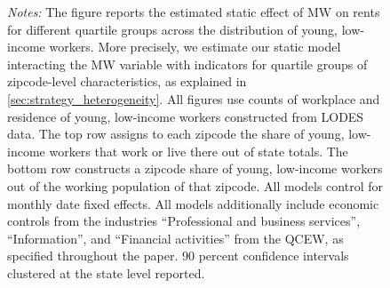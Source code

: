 \begin{figure}[htb!]
\begin{minipage}{\textwidth}
		\vspace{3mm}	
		\textit{Notes:} The figure reports the estimated static effect of MW on rents for different 
		quartile groups across the distribution of young, low-income workers. More precisely, we estimate
		our static model interacting the MW variable with indicators for quartile groups of zipcode-level 
		characteristics, as explained in \autoref{sec:strategy_heterogeneity}. All figures use counts of 
		workplace and residence of young, low-income workers constructed from LODES data. The top 
		row assigns to each zipcode the share of young, low-income workers that work or live there out 
		of state totals. The bottom row constructs a zipcode share of young, low-income workers out of 
		the working population of that zipcode. All models control for monthly date fixed effects. All 
		models additionally include economic controls from the industries ``Professional and business 
		services'', ``Information'', and ``Financial activities'' from the QCEW, as specified throughout
		the paper. 90 percent confidence intervals clustered at the state level reported. 
	\end{minipage}
\end{figure}

